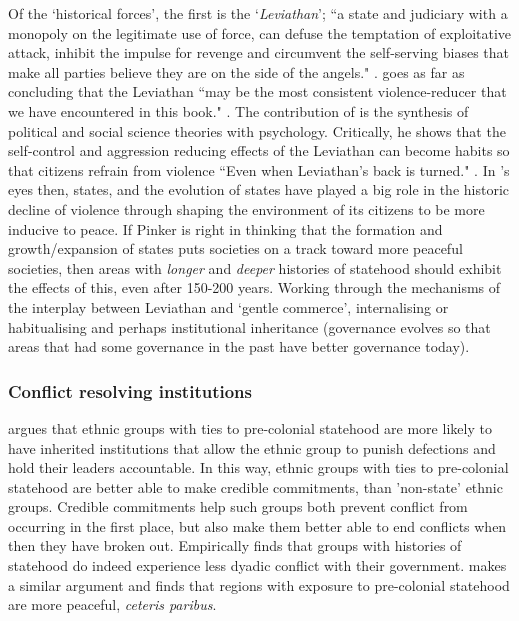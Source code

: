 \documentclass[12pt]{article}
\begin{document}
Of the `historical forces', the first is the `\textit{Leviathan}'; ``a state and
judiciary with a monopoly on the legitimate use of force, can defuse the
temptation of exploitative attack, inhibit the impulse for revenge and
circumvent the self-serving biases that make all parties believe they are on the
side of the angels." \citep[xxvi]{Pinker2012}. \citet{Pinker2012} goes as far as
concluding that the Leviathan ``may be the most consistent violence-reducer that
we have encountered in this book." \citep[680]{Pinker2012}. The contribution of
\citet{Pinker2012} is the synthesis of political and social science theories
with psychology. Critically, he shows that the self-control and aggression
reducing effects of the Leviathan can become habits so that citizens refrain
from violence ``Even when Leviathan's back is turned." \citep[681]{Pinker2012}. In
\citet{Pinker2012}'s eyes then, states, and the evolution of states have played
a big role in the historic decline of violence through shaping the environment
of its citizens to be more inducive to peace. If Pinker is right in thinking
that the formation and growth/expansion of states puts societies on a track
toward more peaceful societies, then areas with \textit{longer} and
\textit{deeper} histories of statehood should exhibit the effects of this, even
after 150-200 years. Working through the mechanisms of the interplay between
Leviathan and `gentle commerce', internalising or habitualising and perhaps
institutional inheritance (governance evolves so that areas that had some
governance in the past have better governance today).

\subsubsection{Conflict resolving institutions}

\citet{Wig2016} argues that ethnic groups with ties to pre-colonial statehood
are more likely to have inherited institutions that allow the ethnic group to
punish defections and hold their leaders accountable.  In this way, ethnic
groups with ties to pre-colonial statehood are better able to make credible
commitments, than 'non-state' ethnic groups.  Credible commitments help such
groups both prevent conflict from occurring in the first place, but also make
them better able to end conflicts when then they have broken out.  Empirically
\citet{Wig2016} finds that groups with histories of statehood do indeed
experience less dyadic conflict with their government.
\citet{Depetris-Chauvin2016} makes a similar argument and finds that regions
with exposure to pre-colonial statehood are more peaceful, \textit{ceteris
paribus}.
\end{document}
